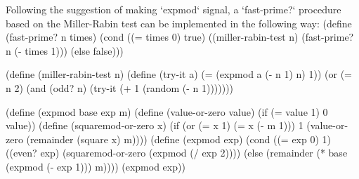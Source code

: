 Following the suggestion of making `expmod` signal, a `fast-prime?` procedure based on the Miller-Rabin test can be implemented in the following way:
\begtt\scm
(define (fast-prime? n times)
  (cond ((= times 0) true)
        ((miller-rabin-test n) (fast-prime? n (- times 1)))
        (else false)))

(define (miller-rabin-test n)
  (define (try-it a)
    (= (expmod a (- n 1) n) 1))
  (or (= n 2)
      (and (odd? n)
           (try-it (+ 1 (random (- n 1)))))))

(define (expmod base exp m)
  (define (value-or-zero value)
    (if (= value 1) 0 value))
  (define (squaremod-or-zero x)
    (if (or (= x 1) (= x (- m 1)))
        1
        (value-or-zero (remainder (square x) m))))
  (define (expmod exp)
    (cond ((= exp 0) 1)
          ((even? exp)
           (squaremod-or-zero (expmod (/ exp 2))))
          (else
           (remainder
             (* base (expmod (- exp 1)))
             m))))
  (expmod exp))
\endtt
